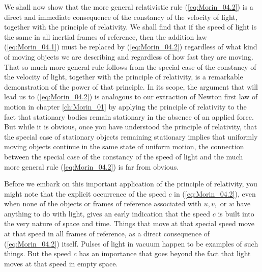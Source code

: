 We shall now show that the more general relativistic rule (\ref{eq:Morin_04.2}) is a direct and immediate consequence of the constancy of the velocity of light, together with the principle of relativity. We shall find that if the speed of light is the same in all inertial frames of reference, then the addition law (\ref{eq:Morin_04.1}) must be replaced by (\ref{eq:Morin_04.2}) regardless of what kind of moving objects we are describing and regardless of how fast they are moving. That so much more general rule follows from the special case of the constancy of the velocity of light, together with the principle of relativity, is a remarkable demonstration of the power of that principle. In its scope, the argument that will lead us to (\ref{eq:Morin_04.2}) is analogous to our extraction of Newton first law of motion in chapter \ref{ch:Morin_01} by applying the principle of relativity to the fact that stationary bodies remain stationary in the absence of an applied force. But while it is obvious, once you have understood the principle of relativity, that the special case of stationary objects remaining stationary implies that uniformly moving objects continue in the same state of uniform motion, the connection between the special case of the constancy of the speed of light and the much more general rule (\ref{eq:Morin_04.2}) is far from obvious.

Before we embark on this important application of the principle of relativity, you might note that the explicit occurrence of the speed $c$ in (\ref{eq:Morin_04.2}), even when none of the objects or frames of reference associated with $u, v, \text{ or } w$ have anything to do with light, gives an early indication that the speed $c$ is built into the very nature of space and time. Things that move at that special speed move at that speed in all frames of reference, as a direct consequence of (\ref{eq:Morin_04.2}) itself. Pulses of light in vacuum happen to be examples of such things. But the speed $c$ has an importance that goes beyond the fact that light moves at that speed in empty space. 

